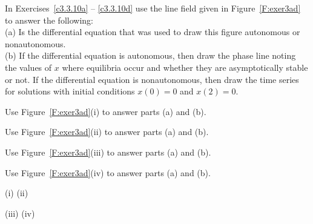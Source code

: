 \documentclass{ximera}
\begin{document}
\noindent In Exercises~\ref{c3.3.10a} -- \ref{c3.3.10d} use the line field 
given in Figure~\ref{F:exer3ad} to answer the following:\\
\noindent (a) Is the differential equation that was used to draw this figure 
autonomous or nonautonomous.\\
\noindent (b)  If the differential equation is autonomous, then draw the phase
line noting the values of $x$ where equilibria occur and whether they are 
asymptotically stable or not. If the differential equation is nonautonomous, 
then draw the time series for solutions with initial conditions $x(0)=0$ and 
$x(2)=0$.

\begin{exercise} \label{c3.3.10a}
Use Figure~\ref{F:exer3ad}(i) to answer parts (a) and (b).
\end{exercise}
\begin{exercise} \label{c3.3.10b}
Use Figure~\ref{F:exer3ad}(ii) to answer parts (a) and (b).
\end{exercise}
\begin{exercise} \label{c3.3.10c}
Use Figure~\ref{F:exer3ad}(iii) to answer parts (a) and (b).
\end{exercise}
\begin{exercise} \label{c3.3.10d}
Use Figure~\ref{F:exer3ad}(iv) to answer parts (a) and (b).
\end{exercise}

\begin{figure*}[htb]
       \centerline{%
	}
\centerline{(i) \hspace{2.6in} (ii)}
       \centerline{%
	}
\centerline{(iii) \hspace{2.6in} (iv)}
       \caption{Figures for Exercises~\protect{\ref{c3.3.10a}} --
\protect{\ref{c3.3.10d}}}
       \label{F:exer3ad}
\end{figure*}
\end{document}
